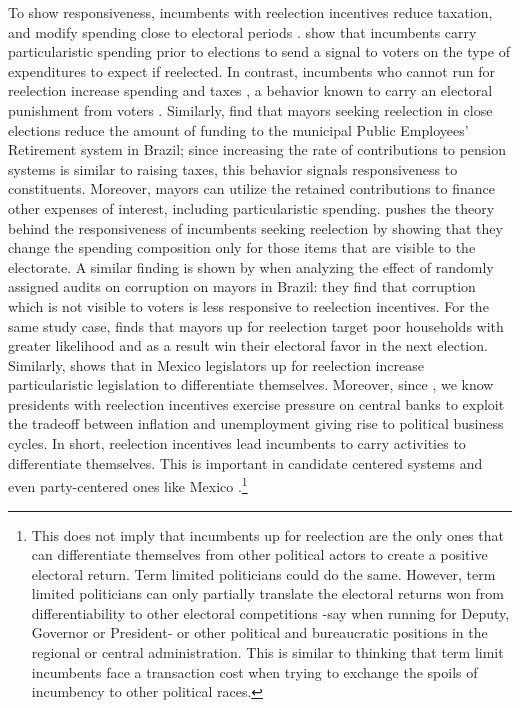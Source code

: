 \documentclass[12pt]{amsart}
\numberwithin{equation}{section}
\theoremstyle{definition}
\theoremstyle{definition}
\theoremstyle{definition}
\begin{document}
To show responsiveness, incumbents with reelection incentives reduce taxation, and modify spending close to electoral periods \citep{Rogoff_1988, Rogoff_1990, klein_sakurai_2015}. \citet{Drazen_eslava_2005} show that incumbents carry particularistic spending prior to elections to send a signal to voters on the type of expenditures to expect if reelected. In contrast, incumbents who cannot run for reelection increase spending and taxes \citep{Besley_case_1995}, a behavior known to carry an electoral punishment from voters \citep{peltzman_1992}. Similarly, \citet{Schettini_2020} find that mayors seeking reelection in close elections reduce the amount of funding to the municipal Public Employees’ Retirement system in Brazil; since increasing the rate of contributions to pension systems is similar to raising taxes, this behavior signals responsiveness to constituents. Moreover, mayors can utilize the retained contributions to finance other expenses of interest, including particularistic spending. \citet{akhmedov_2004} pushes the theory behind the responsiveness of incumbents seeking reelection by showing that they change the spending composition only for those items that are visible to the electorate. A similar finding is shown by \citet{ferraz_finan_2011} when analyzing the effect of randomly assigned audits on corruption on mayors in Brazil: they find that corruption which is not visible to voters is less responsive to reelection incentives. For the same study case, \citet{frey_2021} finds that mayors up for reelection target poor households with greater likelihood and as a result win their electoral favor in the next election. Similarly, \citet{motolinia_2020} shows that in Mexico legislators up for reelection increase particularistic legislation to differentiate themselves. Moreover, since \citet{Nordhaus_1975}, we know presidents with reelection incentives exercise pressure on central banks to exploit the tradeoff between inflation and unemployment giving rise to political business cycles. In short, reelection incentives lead incumbents to carry activities to differentiate themselves. This is important in candidate centered systems and even party-centered ones like Mexico \citep{motolinia_2020}.\footnote{This does not imply that incumbents up for reelection are the only ones that can differentiate themselves from other political actors to create a positive electoral return. Term limited politicians could do the same. However, term limited politicians can only partially translate the electoral returns won from differentiability to other electoral competitions -say when running for Deputy, Governor or President- or other political and bureaucratic positions in the regional or central administration. This is similar to thinking that term limit incumbents face a transaction cost when trying to exchange the spoils of incumbency to other political races.} 
\end{document}
